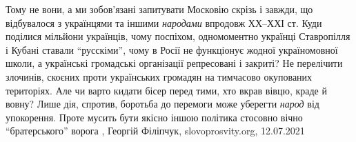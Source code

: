 Тому не вони, а ми зобов’язані запитувати Московію скрізь і завжди, що
відбувалося з українцями та іншими \emph{народами} впродовж ХХ–ХХІ ст. Куди поділися
мільйони українців, чому поспіхом, одномоментно українці Ставропілля і Кубані
ставали \enquote{русскіми}, чому в Росії не функціонує жодної україномовної школи, а
українські громадські організації репресовані і закриті?  Не перелічити
злочинів, скоєних проти українських громадян на тимчасово окупованих
територіях. Але чи варто кидати бісер перед тими, хто вкрав вівцю, краде й
вовну? Лише дія, спротив, боротьба до перемоги може уберегти \emph{народ} від
упокорення. Проте мусить бути якісно іншою політика стосовно вічно
\enquote{братерського} ворога
, Георгій Філіпчук, slovoprosvity.org, 12.07.2021
